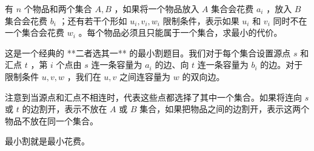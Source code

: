 有 $n$ 个物品和两个集合 $A,B$ ，如果将一个物品放入 $A$ 集合会花费 $a_i$ ，放入 $B$ 集合会花费 $b_i$ ；还有若干个形如 $u_i,v_i,w_i$ 限制条件，表示如果 $u_i$ 和 $v_i$ 同时不在一个集合会花费 $w_i$ 。每个物品必须且只能属于一个集合，求最小的代价。

这是一个经典的 **二者选其一** 的最小割题目。我们对于每个集合设置源点 $s$ 和汇点 $t$ ，第 $i$ 个点由 $s$ 连一条容量为 $a_i$ 的边、向 $t$ 连一条容量为 $b_i$ 的边。对于限制条件 $u,v,w$ ，我们在 $u,v$ 之间连容量为 $w$ 的双向边。

注意到当源点和汇点不相连时，代表这些点都选择了其中一个集合。如果将连向 $s$ 或 $t$ 的边割开，表示不放在 $A$ 或 $B$ 集合，如果把物品之间的边割开，表示这两个物品不放在同一个集合。

最小割就是最小花费。
